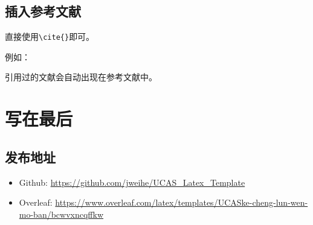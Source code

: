 \documentclass[12pt,hyperref,a4paper,UTF8]{ctexart}
\begin{document}
%
%
%
%
%
%

\subsection{插入参考文献}
直接使用\verb|\cite{}|即可。

例如：


   \textit{ %
   }


引用过的文献会自动出现在参考文献中。

\section{写在最后}
\subsection{发布地址}
\begin{itemize}
    \item Github: \url{https://github.com/jweihe/UCAS_Latex_Template}
    \item Overleaf:  \url{https://www.overleaf.com/latex/templates/UCASke-cheng-lun-wen-mo-ban/bcwvxncqffkw}
\end{itemize}


\end{document}
